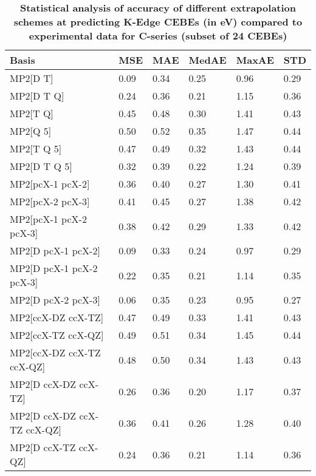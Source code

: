 \begin{table}
  \caption{\textbf{Statistical analysis of accuracy of different extrapolation schemes at predicting K-Edge CEBEs (in eV) compared to experimental data for C-series (subset of 24 CEBEs)}}
  \begin{tabular}{l l l l l l }
    \toprule
    \textbf{Basis} & \textbf{MSE} & \textbf{MAE} & \textbf{MedAE} & \textbf{MaxAE} & \textbf{STD} \\ 
    \midrule
    MP2[D T] & 0.09 & 0.34 & 0.25 & 0.96 & 0.29 \\ 
    MP2[D T Q] & 0.24 & 0.36 & 0.21 & 1.15 & 0.36 \\ 
    MP2[T Q] & 0.45 & 0.48 & 0.30 & 1.41 & 0.43 \\ 
    MP2[Q 5] & 0.50 & 0.52 & 0.35 & 1.47 & 0.44 \\ 
    MP2[T Q 5] & 0.47 & 0.49 & 0.32 & 1.43 & 0.44 \\ 
    MP2[D T Q 5] & 0.32 & 0.39 & 0.22 & 1.24 & 0.39 \\ 
    MP2[pcX-1 pcX-2] & 0.36 & 0.40 & 0.27 & 1.30 & 0.41 \\ 
    MP2[pcX-2 pcX-3] & 0.41 & 0.45 & 0.27 & 1.38 & 0.42 \\ 
    MP2[pcX-1 pcX-2 pcX-3] & 0.38 & 0.42 & 0.29 & 1.33 & 0.42 \\ 
    MP2[D pcX-1 pcX-2] & 0.09 & 0.33 & 0.24 & 0.97 & 0.29 \\ 
    MP2[D pcX-1 pcX-2 pcX-3] & 0.22 & 0.35 & 0.21 & 1.14 & 0.35 \\ 
    MP2[D pcX-2 pcX-3] & 0.06 & 0.35 & 0.23 & 0.95 & 0.27 \\ 
    MP2[ccX-DZ ccX-TZ] & 0.47 & 0.49 & 0.33 & 1.41 & 0.43 \\ 
    MP2[ccX-TZ ccX-QZ] & 0.49 & 0.51 & 0.34 & 1.45 & 0.44 \\ 
    MP2[ccX-DZ ccX-TZ ccX-QZ] & 0.48 & 0.50 & 0.34 & 1.43 & 0.43 \\ 
    MP2[D ccX-DZ ccX-TZ] & 0.26 & 0.36 & 0.20 & 1.17 & 0.37 \\ 
    MP2[D ccX-DZ ccX-TZ ccX-QZ] & 0.36 & 0.41 & 0.26 & 1.28 & 0.40 \\ 
    MP2[D ccX-TZ ccX-QZ] & 0.24 & 0.36 & 0.21 & 1.14 & 0.36 \\ 
    \bottomrule
  \end{tabular}
\end{table}
